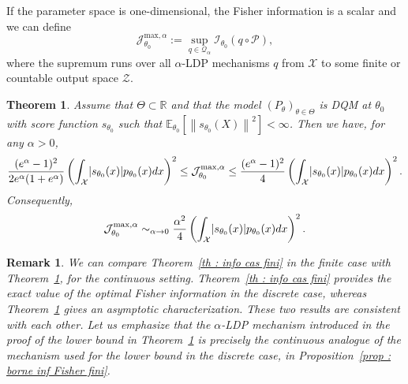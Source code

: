 \documentclass[a4paper, 11pt]{article}
\newtheorem{thm}{Theorem}
\newtheorem{rem}{Remark}
\theoremstyle{definition}
\newcommand{\norm}[1]{\left\|{#1}\right\|}
\newcommand{\E}{{\mathbb{E}}}
\newcommand{\R}{{\mathbb{R}}}
\newcommand{\cI}{{\mathcal{I}}}
\newcommand{\cJ}{{\mathcal{J}}}
\newcommand{\cP}{{\mathcal{P}}}
\newcommand{\cQ}{{\mathcal{Q}}}
\newcommand{\cX}{{\mathcal{X}}}
\newcommand{\cZ}{{\mathcal{Z}}}
\DeclarePairedDelimiter{\abs}{\lvert}{\rvert}
\begin{document}
{If the parameter space is one-dimensional, the Fisher information is a scalar and we can define
\begin{equation*}
	\cJ^{\text{max},\alpha}_{\theta_0} := \sup_{q \in \cQ_\alpha} \cI_{\theta_0}(q \circ \cP),
\end{equation*}
where the supremum runs over all $\alpha$-LDP mechanisms $q$ from $\cX$ to some finite or countable output space $\cZ$.


\begin{thm} \label{thm : equivalent alpha petit ctn}
Assume that $\Theta \subset \R$ and that the model $(P_{\theta})_{\theta \in \Theta}$ is DQM at $\theta_0$ with score function $s_{\theta_0}$ such that $\E_{\theta_0}\left[\norm{s_{\theta_0}(X)}^2\right] < \infty$.
	Then we have, for any $\alpha>0$,
	\begin{equation} \label{eq :  encadrement Fisher ctn small alpha}
 \frac{(e^\alpha-1)^2}{2e^\alpha(1+e^\alpha)}
\left( \int_\cX \abs{s_{\theta_0}(x)}p_{\theta_0}(x)dx \right)^2
\le
		\cJ^{\text{max},\alpha}_{\theta_0} \le \frac{(e^\alpha-1)^2}{4}
		\left( \int_\cX \abs{s_{\theta_0}(x)}p_{\theta_0}(x)dx \right)^2.	
	\end{equation}
	Consequently,
\begin{equation*}
\cJ^{\text{max},\alpha}_{\theta_0} \sim_{\alpha\to0} \frac{\alpha^2}{4}
	\left( \int_\cX \abs{s_{\theta_0}(x)}p_{\theta_0}(x)dx \right)^2.		
\end{equation*}	
\end{thm}


\begin{rem}
We can compare Theorem~\ref{th : info cas fini} in the finite case with Theorem~\ref{thm : equivalent alpha petit ctn}, for the continuous setting. Theorem~\ref{th : info cas fini} provides the exact value of the optimal Fisher information in the discrete case, whereas Theorem~\ref{thm : equivalent alpha petit ctn} gives an asymptotic characterization. These two results are consistent with each other. Let us emphasize that the $\alpha$-LDP mechanism introduced in the proof of the lower bound in Theorem~\ref{thm : equivalent alpha petit ctn} is precisely the continuous analogue of the mechanism used for the lower bound in the discrete case, in Proposition~\ref{prop : borne inf Fisher fini}.
\end{rem}

}
\end{document}

